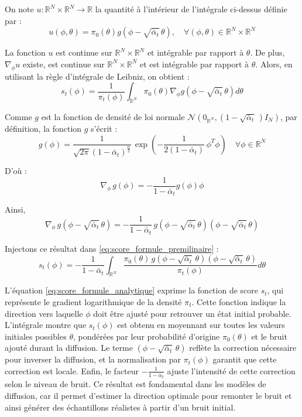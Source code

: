 \documentclass[a4paper,10pt]{article}
\theoremstyle{definition} %
\theoremstyle{definition} %
\theoremstyle{definition} %
\theoremstyle{definition} %
\newcommand{\R}{\mathbb{R}}
\begin{document}
On note $u: \R^N \times \R^N \rightarrow \R$ la quantité à l'intérieur de l'intégrale ci-dessus définie par :
\[u(\phi,\theta) =  \pi_0(\theta) g(\phi - \sqrt{\bar \alpha_t}\,\theta), \quad \forall (\phi,\theta) \in \R^N \times \R^N\]

La fonction $u$ est continue sur $\R^N \times \R^N$ et intégrable par rapport à $\theta$. De plus, $\nabla_\phi u$ existe, est continue sur $\R^N \times \R^N$ et est intégrable par rapport à $\theta$. Alors, en utilisant la règle d'intégrale de Leibniz, on obtient :
\begin{equation}\label{eq:score_formule_premilinaire}
    s_t(\phi) = \frac{1}{\pi_t(\phi)} \int_{\R^N} \pi_0(\theta) \nabla_\phi g(\phi - \sqrt{\bar \alpha_t} \,\theta) d\theta 
\end{equation}

Comme $g$ est la fonction de densité de loi normale $\mathcal{N}\left(0_{\R^N}, (1-\sqrt{\bar \alpha _t} \,)I_N\right)$, par définition, la fonction $g$ s'écrit :
\begin{equation*}
    g(\phi) = \frac{1}{\sqrt{2\pi}(1-\bar \alpha_t)^{\frac{n}{2}}} \, \exp\left(-\frac{1}{2(1-\bar \alpha _t)}\,\phi^T\phi\right) \quad \forall \phi \in \R^N
\end{equation*}

D'où :
\begin{equation*}
    \nabla_\phi \,g(\phi) = -\frac{1}{1-\bar \alpha_t}g(\phi)\phi
\end{equation*}

Ainsi,
\begin{equation*}
    \nabla_\phi \,g(\phi - \sqrt{\bar \alpha_t} \,\theta) = -\frac{1}{1-\bar \alpha_t}\,g(\phi - \sqrt{\bar \alpha_t} \,\theta)(\phi - \sqrt{\bar \alpha_t} \,\theta)
\end{equation*}

Injectons ce résultat dans \cref{eq:score_formule_premilinaire} :
\begin{equation}\label{eq:score_formule_analytique}
    s_t(\phi) = -\frac{1}{1- \bar \alpha_t} \int_{\R^N} \frac{\pi_0(\theta)\, g(\phi - \sqrt{\bar \alpha_t} \,\theta)(\phi - \sqrt{\bar \alpha_t} \,\theta)}{\pi_t(\phi)} d\theta
\end{equation}

L'équation \eqref{eq:score_formule_analytique} exprime la fonction de score \(s_t\), qui représente le gradient logarithmique de la densité \(\pi_t\). Cette fonction indique la direction vers laquelle \(\phi\) doit être ajusté pour retrouver un état initial probable. L'intégrale montre que \(s_t(\phi)\) est obtenu en moyennant sur toutes les valeurs initiales possibles \(\theta\), pondérées par leur probabilité d'origine \(\pi_0(\theta)\) et le bruit ajouté durant la diffusion. Le terme \((\phi - \sqrt{\bar{\alpha}_t}\, \theta)\) reflète la correction nécessaire pour inverser la diffusion, et la normalisation par \(\pi_t(\phi)\) garantit que cette correction est locale. Enfin, le facteur \(-\frac{1}{1- \bar \alpha_t}\) ajuste l'intensité de cette correction selon le niveau de bruit. Ce résultat est fondamental dans les modèles de diffusion, car il permet d'estimer la direction optimale pour remonter le bruit et ainsi générer des échantillons réalistes à partir d’un bruit initial.
\end{document}
